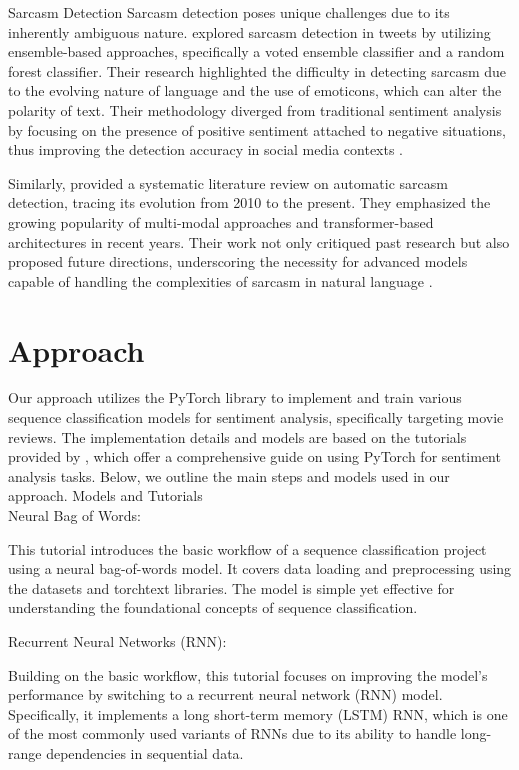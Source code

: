 \documentclass[11pt]{article}
\begin{document}
Sarcasm Detection
Sarcasm detection poses unique challenges due to its inherently ambiguous nature. \cite{Jain2017} explored sarcasm detection in tweets by utilizing ensemble-based approaches, specifically a voted ensemble classifier and a random forest classifier. Their research highlighted the difficulty in detecting sarcasm due to the evolving nature of language and the use of emoticons, which can alter the polarity of text. Their methodology diverged from traditional sentiment analysis by focusing on the presence of positive sentiment attached to negative situations, thus improving the detection accuracy in social media contexts .

Similarly, \cite{Baroiu2022} provided a systematic literature review on automatic sarcasm detection, tracing its evolution from 2010 to the present. They emphasized the growing popularity of multi-modal approaches and transformer-based architectures in recent years. Their work not only critiqued past research but also proposed future directions, underscoring the necessity for advanced models capable of handling the complexities of sarcasm in natural language .



\section{Approach}


Our approach utilizes the PyTorch library to implement and train various sequence classification models for sentiment analysis, specifically targeting movie reviews. The implementation details and models are based on the tutorials provided by \cite{Trevett2023}, which offer a comprehensive guide on using PyTorch for sentiment analysis tasks. Below, we outline the main steps and models used in our approach.
\newline
Models and Tutorials
\\

Neural Bag of Words:

This tutorial introduces the basic workflow of a sequence classification project using a neural bag-of-words model. It covers data loading and preprocessing using the datasets and torchtext libraries. The model is simple yet effective for understanding the foundational concepts of sequence classification.

Recurrent Neural Networks (RNN):

Building on the basic workflow, this tutorial focuses on improving the model's performance by switching to a recurrent neural network (RNN) model. Specifically, it implements a long short-term memory (LSTM) RNN, which is one of the most commonly used variants of RNNs due to its ability to handle long-range dependencies in sequential data.
\end{document}
